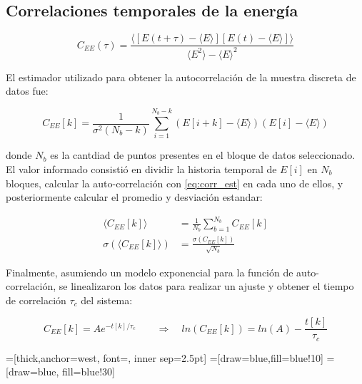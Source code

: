 \documentclass[a4paper,12pt]{article}
\begin{document}
\subsection{Correlaciones temporales de la energía}

\begin{equation}\label{eq:corr_teo}
C_{EE}(\tau) = \frac{\langle \left[E(t+\tau)-\langle 
E\rangle\right]\left[E(t)-\langle E \rangle\right] \rangle
}{\langle E^2\rangle - \langle E \rangle ^2}
\end{equation}

El estimador utilizado para obtener la autocorrelación de la muestra discreta 
de datos fue:

\begin{equation}\label{eq:corr_est}
C_{EE}[k] = \frac{1}{\sigma^2(N_b-k)} \sum_{i=1}^{N_b - k}\left(E[i+k] - 
\langle E \rangle\right)\left(E[i]-\langle E\rangle\right)
\end{equation}

\noindent donde $N_b$ es la cantdiad de puntos presentes en el bloque de datos 
seleccionado. El valor informado consistió en dividir la historia temporal de 
$E[i]$ en $N_b$ bloques, calcular la auto-correlación con \eqref{eq:corr_est} 
en cada uno de ellos, y posteriormente calcular el promedio y desviación 
estandar:

\begin{subequations}
\begin{align}
\langle C_{EE}[k]\rangle &= \frac{1}{N_b} \sum_{b=1}^{N_b} C_{EE}[k]\\
\sigma(\langle C_{EE}[k]\rangle) &= \frac{\sigma(C_{EE}[k])}{\sqrt{N_b}}
\end{align}
\end{subequations}

Finalmente, asumiendo un modelo exponencial para la función de 
auto-correlación, se linealizaron los datos para realizar un ajuste y obtener 
el tiempo de correlación $\tau_c$ del sistema:

\begin{equation}
C_{EE}[k]=A e^{-t[k]/\tau_c} \qquad \Rightarrow \quad ln\left(C_{EE}[k]\right) 
= ln(A) - \frac{t[k]}{\tau_c}
\end{equation}

=[thick,anchor=west, 
font={\scriptsize\ttfamily}, inner sep=2.5pt]
=[draw=blue,fill=blue!10]
=[draw=blue, fill=blue!30]
\end{document}
